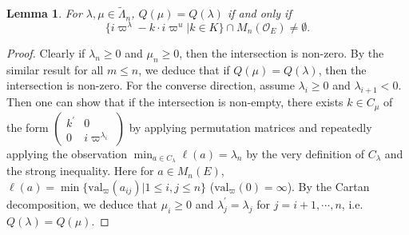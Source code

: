 \documentclass{amsart}
\newtheorem{lemma}[theorem]{Lemma}
\theoremstyle{definition}
\theoremstyle{remark}
\newcommand{\1}{\mathbf{1}}
\theoremstyle{definition}
\newcommand{\CO}{{\mathcal {O}}}
\begin{document}
\begin{lemma}\label{Inter}For $\lambda,\mu\in \tilde{\Lambda}_n$, $Q(\mu)=Q(\lambda)$ if and only if \[\{i\varpi^\lambda-k\cdot i\varpi^u|k\in K\}\cap M_n(\CO_E)\neq \emptyset.\] 
\end{lemma}
\begin{proof} Clearly if $\lambda_n\geq0$ and $\mu_n\geq0$, then the intersection is non-zero. By the similar result for all $m\leq n$, we deduce that if $Q(\mu)=Q(\lambda)$, then 
the intersection is non-zero. For the converse direction, assume $\lambda_i\geq0$ and $\lambda_{i+1}<0$. Then one can show that if the intersection is non-empty, there exists $k\in C_{\mu}$ of the form $\begin{pmatrix} k^\prime & 0 \\ 0 & i \varpi^{\lambda_i}\end{pmatrix}$ by   applying permutation matrices and repeatedly applying the observation $\min_{a\in C_\lambda}\ell(a)=\lambda_n$ by the very definition of $C_\lambda$ and the strong inequality. Here for $a\in M_n(E)$,  $\ell(a)=\min\{\mathrm{val}_\varpi(a_{ij})|1\leq i,j\leq n\}$ ($\mathrm{val}_\varpi(0)=\infty$).  By the Cartan decomposition, we deduce that $\mu_{i}\geq0$ and $\lambda_{j}^\prime=\lambda_j$ for $j=i+1,\cdots,n$, i.e. $Q(\lambda)=Q(\mu)$. 
\end{proof}
\end{document}
